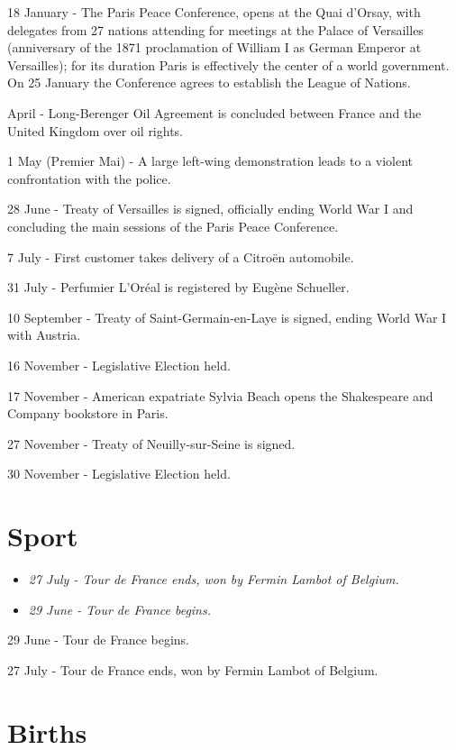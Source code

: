 18 January - The Paris Peace Conference, opens at the Quai d'Orsay, with
delegates from 27 nations attending for meetings at the Palace of
Versailles (anniversary of the 1871 proclamation of William I as German
Emperor at Versailles); for its duration Paris is effectively the center
of a world government. On 25 January the Conference agrees to establish
the League of Nations.

April - Long-Berenger Oil Agreement is concluded between France and the
United Kingdom over oil rights.

1 May (Premier Mai) - A large left-wing demonstration leads to a violent
confrontation with the police.

28 June - Treaty of Versailles is signed, officially ending World War I
and concluding the main sessions of the Paris Peace Conference.

7 July - First customer takes delivery of a Citroën automobile.

31 July - Perfumier L'Oréal is registered by Eugène Schueller.

10 September - Treaty of Saint-Germain-en-Laye is signed, ending World
War I with Austria.

16 November - Legislative Election held.

17 November - American expatriate Sylvia Beach opens the Shakespeare and
Company bookstore in Paris.

27 November - Treaty of Neuilly-sur-Seine is signed.

30 November - Legislative Election held.

\section{Sport}\label{sport}

\begin{itemize}
\item
  \emph{27 July - Tour de France ends, won by Fermin Lambot of Belgium.}
\item
  \emph{29 June - Tour de France begins.}
\end{itemize}

29 June - Tour de France begins.

27 July - Tour de France ends, won by Fermin Lambot of Belgium.

\section{Births}\label{births}

